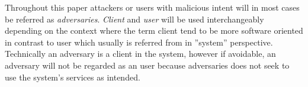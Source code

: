 Throughout this paper attackers or users with malicious intent will in most cases be referred as \emph{adversaries}.
\emph{Client} and \emph{user} will be used interchangeably depending on the context where the term client tend to be more software oriented in contrast to user which usually is referred from in ''system'' perspective. Technically an adversary is a client in the system, however if avoidable, an adversary will not be regarded as an user because adversaries does not seek to use the system's services as intended. 